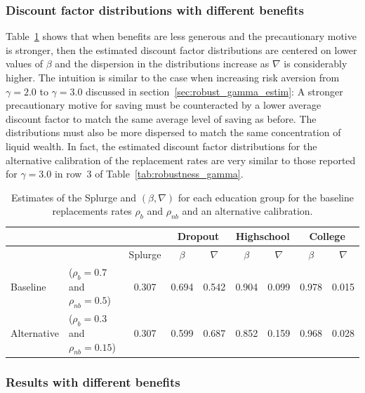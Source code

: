 \documentclass[../HAFiscal]{subfiles}
\begin{document}
\subsubsection{Discount factor distributions with different benefits}
\label{sec:robust_benefits_estim}

Table~\ref{tab:robustness_benefits} shows that when benefits are less generous and the precautionary motive is stronger, then the estimated discount factor distributions are centered on lower values of $\beta$ and the dispersion in the distributions increase as $\nabla$ is considerably higher. The intuition is similar to the case when increasing risk aversion from $\gamma=2.0$ to $\gamma=3.0$ discussed in section~\ref{sec:robust_gamma_estim}: A stronger precautionary motive for saving must be counteracted by a lower average discount factor to match the same average level of saving as before. The distributions must also be more dispersed to match the same concentration of liquid wealth. In fact, the estimated discount factor distributions for the alternative calibration of the replacement rates are very similar to those reported for $\gamma=3.0$ in row~3 of Table~\ref{tab:robustness_gamma}. 

\begin{table}[t]
\begin{center}
	\begin{tabular}{llc|cccccc} 
		\toprule
		& & & \multicolumn{2}{c}{Dropout} & \multicolumn{2}{c}{Highschool} & \multicolumn{2}{c}{College} \\ \midrule 
		& & Splurge & $\beta$ & $\nabla$ & $\beta$ & $\nabla$ & $\beta$ & $\nabla$ \\ \midrule 
		Baseline & ($\rho_{b}=0.7$ and $\rho_{nb}=0.5$) & 0.307 & 0.694 & 0.542 & 0.904 & 0.099 & 0.978 & 0.015 \\ 
		Alternative & ($\rho_{b}=0.3$ and $\rho_{nb}=0.15$) & 0.307 & 0.599 & 0.687 & 0.852 & 0.159 & 0.968 & 0.028
		\\ \bottomrule 
	\end{tabular}
\end{center}
\caption{Estimates of the Splurge and $(\beta,\nabla)$ for each education group for the baseline replacements rates $\rho_{b}$ and $\rho_{nb}$ and an alternative calibration.}
\label{tab:robustness_benefits}
\end{table}


\FloatBarrier
\subsubsection{Results with different benefits}
\label{sec:robust_benefits_results}
\end{document}

